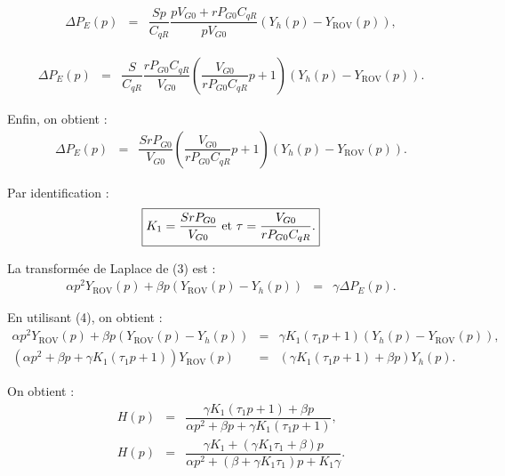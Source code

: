 \begin{multicols}{2}
\begin{corrige}
 \begin{eqnarray}
\Delta P_E(p)&=&\dfrac{Sp}{C_{qR}}\dfrac{pV_{G0}+{rP_{G0}C_{qR}}}{pV_{G0} }\left( Y_h(p)-  Y_{\text{ROV}}(p)\right), \nonumber
\end{eqnarray}


 \begin{eqnarray}
\Delta P_E(p)&=&\dfrac{S}{C_{qR}}\dfrac{{rP_{G0}C_{qR}}}{V_{G0} }\left(\dfrac{V_{G0}}{{rP_{G0}C_{qR}} }p+1\right)\left( Y_h(p)-  Y_{\text{ROV}}(p)\right). \nonumber
\end{eqnarray}

Enfin, on obtient :
\begin{eqnarray}
\Delta P_E(p)&=&\dfrac{{SrP_{G0}}}{V_{G0} }\left(\dfrac{V_{G0}}{{rP_{G0}C_{qR}} }p+1\right)\left( Y_h(p)-  Y_{\text{ROV}}(p)\right). \nonumber
\end{eqnarray}


Par identification :
$$\boxed{K_1=\dfrac{SrP_{G0}}{V_{G0}}$ et $\tau=\dfrac{V_{G0}}{rP_{G0}C_{qR}}.}$$

\end{corrige}
\else
\fi


\ifprof
\begin{corrige}
La transformée de Laplace de (3) est :
\begin{eqnarray}
\alpha p^2 Y_{\text{ROV}}(p)+\beta p \left(Y_{\text{ROV}}(p)-Y_h(p)\right)&=&\gamma \Delta P_E(p). \nonumber
\end{eqnarray}

En utilisant (4), on obtient :
\begin{eqnarray}
\alpha p^2 Y_{\text{ROV}}(p)+\beta p \left(Y_{\text{ROV}}(p)-Y_h(p)\right)&=&\gamma K_1\left(\tau_1 p+1\right)\left( Y_h(p)-  Y_{\text{ROV}}(p)\right), \nonumber\\
\left(\alpha p^2+\beta p+\gamma K_1\left(\tau_1 p+1\right)\right) Y_{\text{ROV}}(p)&=&\left(\gamma K_1\left(\tau_1 p+1\right)+\beta p\right) Y_h(p). \nonumber
\end{eqnarray}

On obtient :
\begin{eqnarray}
H(p)&= &\dfrac{\gamma K_1\left(\tau_1 p+1\right)+\beta p}{\alpha p^2+\beta p+\gamma K_1\left(\tau_1 p+1\right)},\nonumber \\
H(p)&= &\dfrac{\gamma K_1 + (\gamma K_1\tau_1+\beta)p}{\alpha p^2+(\beta +\gamma K_1\tau_1)p+K_1\gamma}.\nonumber 
\end{eqnarray}


\end{corrige}
\end{multicols}
